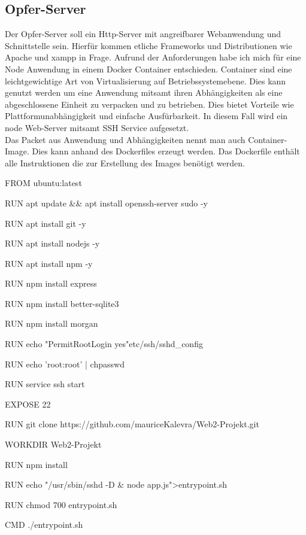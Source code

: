 \documentclass[12pt]{article}
\begin{document}
\subsection{Opfer-Server}
Der Opfer-Server soll ein Http-Server mit angreifbarer Webanwendung und Schnittstelle sein. Hierfür kommen etliche Frameworks und Distributionen wie Apache und xampp in Frage.
Aufrund der Anforderungen habe ich mich für eine Node Anwendung in einem Docker Container entschieden.
Container sind eine leichtgewichtige Art von Virtualisierung auf Betriebssystemebene. Dies kann genutzt werden um eine Anwendung mitsamt ihren Abhängigkeiten als eine abgeschlossene Einheit zu verpacken und zu betrieben. Dies bietet Vorteile wie Plattformunabhängigkeit und einfache Ausfürbarkeit. In diesem Fall wird ein node Web-Server mitsamt SSH Service aufgesetzt.\\
Das Packet aus Anwendung und Abhängigkeiten
nennt man auch Container-Image. Dies kann anhand des Dockerfiles erzeugt werden. Das Dockerfile enthält alle Instruktionen die zur Erstellung des Images benötigt werden.  \\
\begin{shaded}
\begin{internallinenumbers}
FROM ubuntu:latest

RUN apt update \&\& apt install  openssh-server sudo -y

RUN apt install git -y

RUN apt install nodejs -y

RUN apt install npm -y

RUN npm install express

RUN npm install better-sqlite3

RUN npm install morgan

RUN echo "PermitRootLogin yes"\>etc/ssh/sshd\_config

RUN  echo 'root:root' | chpasswd

RUN service ssh start

EXPOSE 22

RUN git clone https://github.com/mauriceKalevra/Web2-Projekt.git

WORKDIR Web2-Projekt

RUN npm install

RUN echo  "/usr/sbin/sshd -D \& node app.js">entrypoint.sh

RUN chmod 700 entrypoint.sh

CMD ./entrypoint.sh
\end{internallinenumbers}
\end{shaded}
\end{document}
